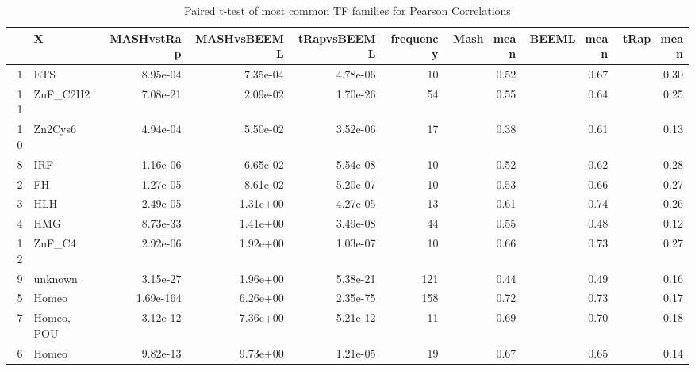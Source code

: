\documentclass{article}
\begin{document}
	\begin{table}[h] %
		\centering
		\begin{adjustbox}{width=1\textwidth}
			\small
			\begin{tabular}{rlrrrrrrr}
				\hline
				& X & MASHvstRap & MASHvsBEEML & tRapvsBEEML & frequency & Mash\_mean & BEEML\_mean & tRap\_mean \\ 
				\hline
				1 & ETS & 8.95e-04 & 7.35e-04 & 4.78e-06 &  10 & 0.52 & 0.67 & 0.30 \\ 
				11 & ZnF\_C2H2 & 7.08e-21 & 2.09e-02 & 1.70e-26 &  54 & 0.55 & 0.64 & 0.25 \\ 
				10 & Zn2Cys6 & 4.94e-04 & 5.50e-02 & 3.52e-06 &  17 & 0.38 & 0.61 & 0.13 \\ 
				8 & IRF & 1.16e-06 & 6.65e-02 & 5.54e-08 &  10 & 0.52 & 0.62 & 0.28 \\ 
				2 & FH & 1.27e-05 & 8.61e-02 & 5.20e-07 &  10 & 0.53 & 0.66 & 0.27 \\ 
				3 & HLH & 2.49e-05 & 1.31e+00 & 4.27e-05 &  13 & 0.61 & 0.74 & 0.26 \\ 
				4 & HMG & 8.73e-33 & 1.41e+00 & 3.49e-08 &  44 & 0.55 & 0.48 & 0.12 \\ 
				12 & ZnF\_C4 & 2.92e-06 & 1.92e+00 & 1.03e-07 &  10 & 0.66 & 0.73 & 0.27 \\ 
				9 & unknown & 3.15e-27 & 1.96e+00 & 5.38e-21 & 121 & 0.44 & 0.49 & 0.16 \\ 
				5 & Homeo & 1.69e-164 & 6.26e+00 & 2.35e-75 & 158 & 0.72 & 0.73 & 0.17 \\ 
				7 & Homeo, POU & 3.12e-12 & 7.36e+00 & 5.21e-12 &  11 & 0.69 & 0.70 & 0.18 \\ 
				6 & Homeo  & 9.82e-13 & 9.73e+00 & 1.21e-05 &  19 & 0.67 & 0.65 & 0.14 \\ 
				\hline
			\end{tabular}
		\end{adjustbox}
		\caption{Paired t-test of most common TF families for Pearson Correlations} 
	\end{table} 
	
	
	
	
	
\end{document}
